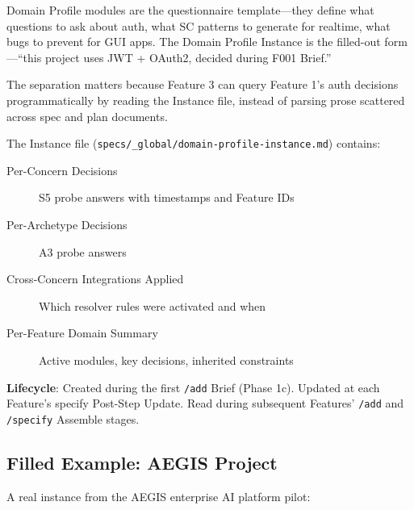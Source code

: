 \documentclass[11pt,a4paper,openright,twoside]{report}
\newcommand{\cmd}[1]{\texttt{/#1}}
\newcommand{\file}[1]{\texttt{#1}}
\begin{document}
\begin{tipbox}
Domain Profile modules are the questionnaire template---they define what questions to ask about auth, what SC patterns to generate for realtime, what bugs to prevent for GUI apps. The Domain Profile Instance is the filled-out form---``this project uses JWT + OAuth2, decided during F001 Brief.''

The separation matters because Feature 3 can query Feature 1's auth decisions programmatically by reading the Instance file, instead of parsing prose scattered across spec and plan documents.
\end{tipbox}

The Instance file (\file{specs/\_global/domain-profile-instance.md}) contains:

\begin{description}
  \item[Per-Concern Decisions] S5 probe answers with timestamps and Feature IDs
  \item[Per-Archetype Decisions] A3 probe answers
  \item[Cross-Concern Integrations Applied] Which resolver rules were activated and when
  \item[Per-Feature Domain Summary] Active modules, key decisions, inherited constraints
\end{description}

\textbf{Lifecycle}: Created during the first \cmd{add} Brief (Phase 1c). Updated at each Feature's specify Post-Step Update. Read during subsequent Features' \cmd{add} and \cmd{specify} Assemble stages.

\subsection{Filled Example: AEGIS Project}

A real instance from the AEGIS enterprise AI platform pilot:
\end{document}
